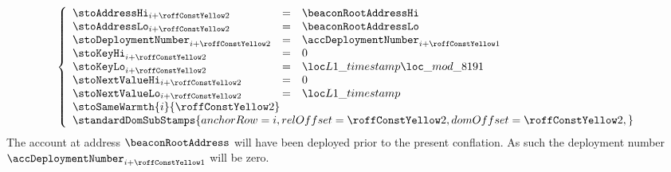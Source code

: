 \item[\underline{\underline{Storing the \inst{TIMESTAMP} in the state:}}]
	\[
		\left\{ \begin{array}{lclr}
			\stoAddressHi        _{i + \roffTxSkipSysiBeaconRootSystemContractStorageSetTimestamp} & = & \beaconRootAddressHi                                                       \\
			\stoAddressLo        _{i + \roffTxSkipSysiBeaconRootSystemContractStorageSetTimestamp} & = & \beaconRootAddressLo                                                       \\
			\stoDeploymentNumber _{i + \roffTxSkipSysiBeaconRootSystemContractStorageSetTimestamp} & = & \accDeploymentNumber _{i + \roffTxSkipSysiBeaconRootSystemContractAccount} \\
			\stoKeyHi            _{i + \roffTxSkipSysiBeaconRootSystemContractStorageSetTimestamp} & = & 0                                                                          \\
			\stoKeyLo            _{i + \roffTxSkipSysiBeaconRootSystemContractStorageSetTimestamp} & = & \locLineaTimestampModuloPrime                                              \\
			\stoNextValueHi      _{i + \roffTxSkipSysiBeaconRootSystemContractStorageSetTimestamp} & = & 0                                                                          \\
			\stoNextValueLo      _{i + \roffTxSkipSysiBeaconRootSystemContractStorageSetTimestamp} & = & \locLineaTimestamp                                                         \\
			\multicolumn{3}{l}{\stoSameWarmth  {i}{\roffTxSkipSysiBeaconRootSystemContractStorageSetTimestamp} } \\
			\multicolumn{3}{l}{
				\standardDomSubStamps {
					anchorRow = i                                                          ,
					relOffset = \roffTxSkipSysiBeaconRootSystemContractStorageSetTimestamp ,
					domOffset = \roffTxSkipSysiBeaconRootSystemContractStorageSetTimestamp ,
				}} \\
		\end{array} \right.
	\]
	\saNote{} \label{hub: tx skip: sysi: eip 4788: deployment number of system contract}
	The account at address $\beaconRootAddress$ will have been deployed prior to the present conflation.
	As such the deployment number
	$\accDeploymentNumber _{i + \roffTxSkipSysiBeaconRootSystemContractAccount}$
	will be zero.
